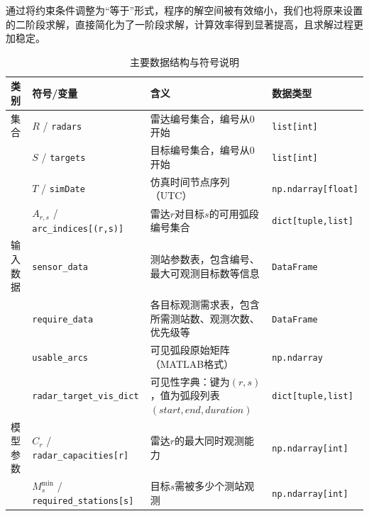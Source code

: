 \documentclass[openany,zihao=-4,UTF8]{ctexart}
\begin{document}
通过将约束条件调整为“等于”形式，程序的解空间被有效缩小，我们也将原来设置的二阶段求解，直接简化为了一阶段求解，计算效率得到显著提高，且求解过程更加稳定。

\begin{table}
    \centering
    \caption{主要数据结构与符号说明}
    \label{table:主要数据结构与符号说明}
    \begin{tabularx}{\columnwidth}{llXl}
        \toprule
        类别   & 符号/变量                                                  & 含义                                             & 数据类型                       \\
        \midrule
        集合   & $R$ / \texttt{radars}                                  & 雷达编号集合，编号从0开始                                  & \texttt{list[int]}         \\
             & $S$ / \texttt{targets}                                 & 目标编号集合，编号从0开始                                  & \texttt{list[int]}         \\
             & $T$ / \texttt{simDate}                                 & 仿真时间节点序列（UTC）                                  & \texttt{np.ndarray[float]} \\
             & $A_{r,s}$ / \texttt{arc\_indices[(r,s)]}               & 雷达$r$对目标$s$的可用弧段编号集合                           & \texttt{dict[tuple,list]}  \\
        输入数据 & \texttt{sensor\_data}                                  & 测站参数表，包含编号、最大可观测目标数等信息                         & \texttt{DataFrame}         \\
             & \texttt{require\_data}                                 & 各目标观测需求表，包含所需测站数、观测次数、优先级等                     & \texttt{DataFrame}         \\
             & \texttt{usable\_arcs}                                  & 可见弧段原始矩阵（MATLAB格式）                             & \texttt{np.ndarray}        \\
             & \texttt{radar\_target\_vis\_dict}                      & 可见性字典：键为$(r,s)$，值为弧段列表$(start, end, duration)$ & \texttt{dict[tuple,list]}  \\
        模型参数 & $C_r$ / \texttt{radar\_capacities[r]}                  & 雷达$r$的最大同时观测能力                                 & \texttt{np.ndarray[int]}   \\
             & $M_s^{\min}$ / \texttt{required\_stations[s]}          & 目标$s$需被多少个测站观测                                 & \texttt{np.ndarray[int]}   \\

\end{tabularx}
\end{table}
\end{document}
